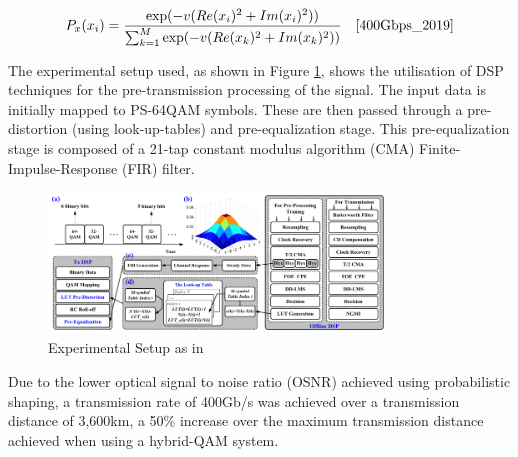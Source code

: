 \begin{equation}
	\label{eq:}
	P_x(x_i) =
	\frac{\exp(-v(Re(x_i)^2+Im(x_i)^2))}{\sum_{k=1}^{M}\exp(-v(Re(x_k)^2+Im(x_k)^2))}  \quad
	\text{\cite{400Gbps_2019}}
\end{equation}

The experimental setup used, as shown in Figure \ref{fig:pstest}, shows the
utilisation of DSP techniques for the pre-transmission processing of the signal.
The input data is initially mapped to PS-64QAM symbols. These are then passed
through a pre-distortion (using look-up-tables) and pre-equalization stage. This
pre-equalization stage is composed of a 21-tap constant modulus algorithm (CMA)
Finite-Impulse-Response (FIR) filter\cite{400Gbps_2019}.

\begin{figure}[H]
	\centering
	\includegraphics[width=0.8\textwidth]{images/PStest}
	\caption{Experimental Setup as in \cite{400Gbps_2019}}
	\label{fig:pstest}
\end{figure}

Due to the lower optical signal to noise ratio (OSNR) achieved using
probabilistic shaping, a transmission rate of 400Gb/s was achieved over a
transmission distance of 3,600km, a 50\% increase over the maximum transmission
distance achieved when using a hybrid-QAM system\cite{400Gbps_2019}.
